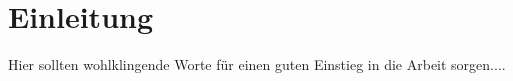 \chapter[Einleitung]{Einleitung}
Hier sollten wohlklingende Worte für einen guten Einstieg in die Arbeit
sorgen....
